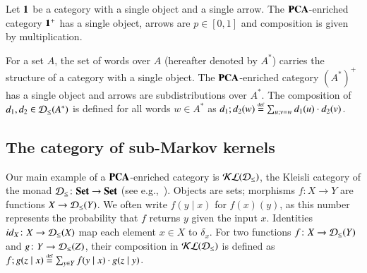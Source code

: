 \begin{example}\label{ex:PCA}
Let $\mathbf{1}$ be a category with a single object and a single arrow. The $\mathbf{PCA}$-enriched category $\mathbf{1}^+$ has a single object, arrows are $p\in[0,1]$ and composition is given by multiplication.

For a set $A$, the set of words  over $A$ (hereafter denoted by $A^*$) carries the structure of a category with a single object.  The $\mathbf{PCA}$-enriched category $(A^*)^+$ has a single object and arrows are subdistributions over $A^*$. The composition of $d_1,d_2\in \mathcal{D}_{\leq}(A^*)$ is defined for all words $w\in A^*$ as $d_1;d_2(w)\stackrel{\text{\tiny def}}{=} \sum_{u;v=w}d_1(u)\cdot d_2(v)$. 
\end{example}

\subsection{The category of sub-Markov kernels}
Our main example of a $\mathbf{PCA}$-enriched category is $\mathcal{KL}(\mathcal{D}_{\leq})$, the Kleisli category of the monad $\mathcal{D}_{\leq}\colon \mathbf{Set} \to \mathbf{Set}$ (see e.g.,~\cite{hasuo2007generic}).
Objects are sets; morphisms \(f \colon X \to Y\) are functions \(X \to \mathcal{D}_{\leq}(Y)\). %
  We often write \(f(y \mid x)\) for \(f(x)(y)\), as this number represents the probability that \(f\) returns \(y\) given the input \(x\).
  Identities \({id}_{X} \colon X \to \mathcal{D}_{\leq}(X)\) map each element \(x \in X\) to \(\delta_{x}\).
  For two functions \(f \colon X \to \mathcal{D}_{\leq}(Y)\) and \(g \colon Y \to \mathcal{D}_{\leq}(Z)\), their composition in $\mathcal{KL}(\mathcal{D}_{\leq})$ is defined as \(f ; g (z \mid x) \stackrel{\text{\tiny def}}{=} \sum_{y \in Y} f(y \mid x) \cdot g(z \mid y)\).


